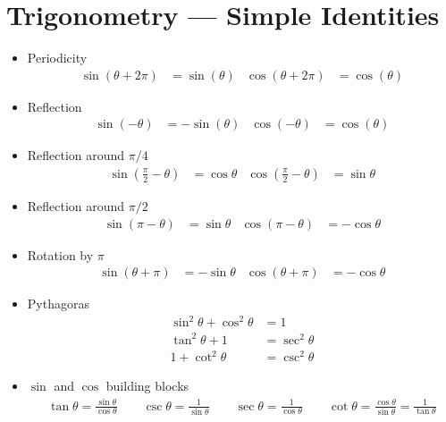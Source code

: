 \section{Trigonometry --- Simple Identities}
\begin{itemize}
 \item Periodicity
\begin{align*}
  \sin(\theta+2\pi) &= \sin(\theta) &
  \cos(\theta+2\pi) &= \cos(\theta) 
\end{align*}
\item Reflection
\begin{align*}
  \sin(-\theta)&=-\sin(\theta) & \cos(-\theta) &=\cos(\theta) 
\end{align*}
\item Reflection around $\pi/4$
\begin{align*}
\sin\left(\tfrac{\pi}{2}-\theta\right)&=\cos\theta &
\cos\left(\tfrac{\pi}{2}-\theta\right)&=\sin\theta 
\end{align*}
\item Reflection around $\pi/2$
\begin{align*}
\sin\left(\pi-\theta\right)&=\sin\theta &
\cos\left(\pi-\theta\right)&=-\cos\theta 
\end{align*}
\item Rotation by $\pi$
\begin{align*}
\sin\left(\theta+\pi\right)&=-\sin\theta &
\cos\left(\theta+\pi\right)&=-\cos\theta 
\end{align*}
\item Pythagoras
\begin{align*}
\sin^2\theta + \cos^2 \theta &=1  \\
\tan^2\theta + 1  &= \sec^2\theta \\
1 + \cot^2 \theta &=\csc^2\theta
\end{align*}
\item $\sin$ and $\cos$ building blocks
\begin{align*}
\tan\theta=\frac{\sin\theta}{\cos\theta}\qquad
\csc\theta=\frac{1}{\sin\theta}\qquad
\sec\theta=\frac{1}{\cos\theta}\qquad
\cot\theta=\frac{\cos\theta}{\sin\theta}=\frac{1}{\tan\theta}
\end{align*}
\end{itemize}

